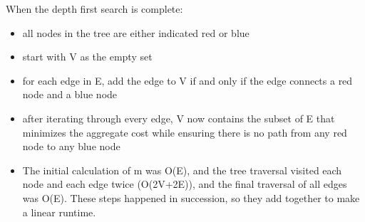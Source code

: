 \documentclass[a4paper]{article}
\begin{document}
When the depth first search is complete:
        
\begin{itemize}
    \item all nodes in the tree are either indicated red or blue
    \item start with V as the empty set
    \item for each edge in E, add the edge to V if and only if the edge connects a red node and a blue node
    \item after iterating through every edge, V now contains the subset of E that minimizes the aggregate cost while ensuring there is no path from any red node to any blue node
    \item The initial calculation of m was O(E), and the tree traversal visited each node and each edge twice (O(2V+2E)), and the final traversal of all edges was O(E). These steps happened in succession, so they add together to make a linear runtime.
\end{itemize}
\end{document}
